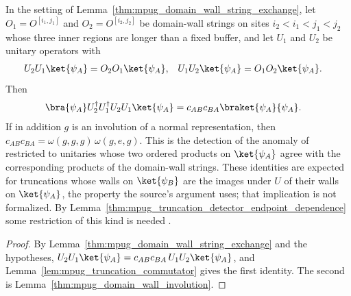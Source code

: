 \begin{lemma}
    \label{thm:mpug_truncation_detector_wall_strings}
    \leanok
    In the setting of Lemma~\ref{thm:mpug_domain_wall_string_exchange}, let
    $O_1=O^{[i_1,j_1]}$ and $O_2=O^{[i_2,j_2]}$ be domain-wall strings on
    sites $i_2<i_1<j_1<j_2$ whose three inner regions are longer than a fixed
    buffer, and let $U_1$ and $U_2$ be unitary operators with
    \begin{align}
        U_2U_1\ket{\psi_A} & =O_2O_1\ket{\psi_A}, &
        U_1U_2\ket{\psi_A} & =O_1O_2\ket{\psi_A}.
        \notag
    \end{align}
    Then
    \begin{align}
        \bra{\psi_A}U_2^\dagger U_1^\dagger U_2U_1\ket{\psi_A}
         & =c_{AB}c_{BA}\braket{\psi_A}{\psi_A}.
        \notag
    \end{align}
    If in addition $g$ is an involution of a normal representation, then
    $c_{AB}c_{BA}=\omega(g,g,g)\,\omega(g,e,g)$. This is the detection of the
    anomaly of \cite[Section~V]{GarreRubioSchuch2024DomainWall} restricted to
    unitaries whose two ordered products on $\ket{\psi_A}$ agree with the
    corresponding products of the domain-wall strings. These identities are
    expected for truncations whose walls on $\ket{\psi_B}$ are the images under
    $U$ of their walls on $\ket{\psi_A}$, the property the source's argument
    uses; that implication is not formalized. By
    Lemma~\ref{thm:mpug_truncation_detector_endpoint_dependence} some
    restriction of this kind is needed
    \cite{gap:gs24_truncation_detector_endpoint_dependence}.
\end{lemma}

\begin{proof}\leanok
    By Lemma~\ref{thm:mpug_domain_wall_string_exchange} and the hypotheses,
    $U_2U_1\ket{\psi_A}=c_{AB}c_{BA}\,U_1U_2\ket{\psi_A}$, and
    Lemma~\ref{lem:mpug_truncation_commutator} gives the first identity. The
    second is Lemma~\ref{thm:mpug_domain_wall_involution}.
\end{proof}

